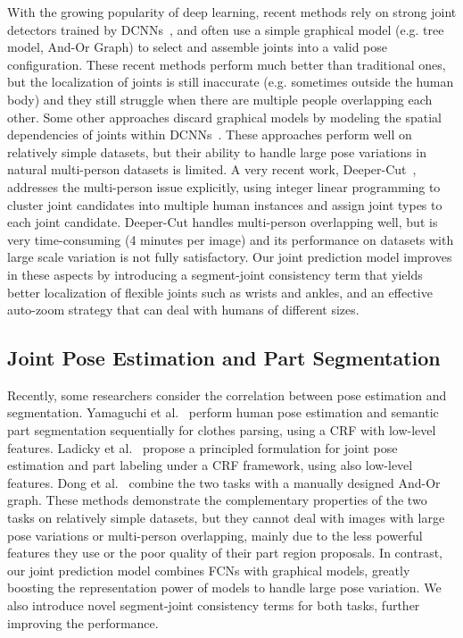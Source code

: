 With the growing popularity of deep learning, recent methods rely on strong joint detectors trained by DCNNs~\cite{chen2014articulated,tompson2015efficient}, and often use a simple graphical model (e.g. tree model, And-Or Graph) to select and assemble joints into a valid pose configuration.
These recent methods perform much better than traditional ones, but the localization of joints is still inaccurate (e.g. sometimes outside the human body) and they still struggle when there are multiple people overlapping each other.
Some other approaches discard graphical models by modeling the spatial dependencies of joints within DCNNs~\cite{toshev2014deeppose,carreira2016human,chu2016structured}. These approaches perform well on relatively simple datasets, but their ability to handle large pose variations in natural multi-person datasets is limited.
A very recent work, Deeper-Cut~\cite{insafutdinov2016deepercut}, addresses the multi-person issue explicitly, using integer linear programming to cluster joint candidates into multiple human instances and assign joint types to each joint candidate.
Deeper-Cut handles multi-person overlapping well, but is very time-consuming (4 minutes per image) and its performance on datasets with large scale variation is not fully satisfactory. Our joint prediction model improves in these aspects by introducing a segment-joint consistency term that yields better localization of flexible joints such as wrists and ankles, and an effective auto-zoom strategy that can deal with humans of different sizes.

\subsection{Joint Pose Estimation and Part Segmentation}
Recently, some researchers consider the correlation between pose estimation and segmentation. Yamaguchi et al.~\cite{yamaguchi2012parsing} perform human pose estimation and semantic part segmentation sequentially for clothes parsing, using a CRF with low-level features. Ladicky et al.~\cite{ladicky2013human} propose a principled formulation for joint pose estimation and part labeling under a CRF framework, using also low-level features. Dong et al.~\cite{dong2014towards} combine the two tasks with a manually designed And-Or graph. These methods demonstrate the complementary properties of the two tasks on relatively simple datasets, but they cannot deal with images with large pose variations or multi-person overlapping, mainly due to the less powerful features they use or the poor quality of their part region proposals. In contrast, our joint prediction model combines FCNs with graphical models, greatly boosting the representation power of models to handle large pose variation. We also introduce novel segment-joint consistency terms for both tasks, further improving the performance.

